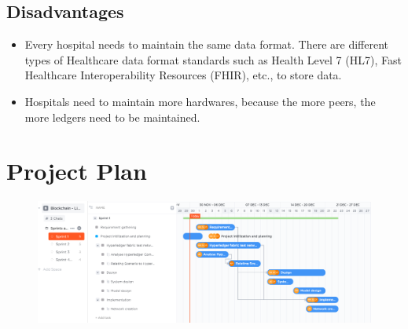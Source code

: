 \documentclass[journal,12pt,onecolumn]{IEEEtran}
\begin{document}
\subsection{Disadvantages}
\begin{itemize}
    \item Every hospital needs to maintain the same data format. There are different types of Healthcare data format standards such as Health Level 7 (HL7), Fast Healthcare Interoperability Resources (FHIR), etc., to store data.
    \item Hospitals need to maintain more hardwares, because the more peers, the more ledgers need to be maintained.
\end{itemize}

\section{Project Plan}


\begin{figure}[!htbp]
\centering
    \includegraphics[width=1\textwidth]{BC_Project_Plan.png}
   
    \caption{}
    \label{fig:gantt_chart}
\end{figure}

\pagebreak
\end{document}
